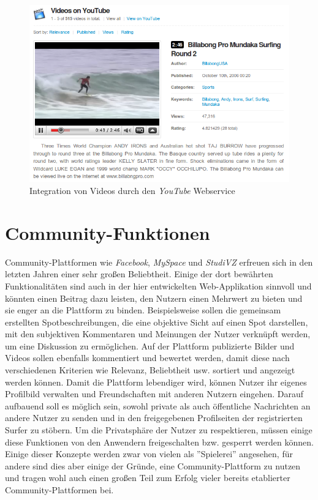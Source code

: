 \begin{figure}[h]
 \includegraphics[width=\textwidth]{bilder/youtube}
 \caption{Integration von Videos durch den \textit{YouTube}
      Webservice}
 \label{youtube}
\end{figure}

\section{Community-Funktionen}
Community-Plattformen wie \textit{Facebook}, \textit{MySpace} und
\textit{StudiVZ} erfreuen sich in den letzten Jahren einer sehr großen
Beliebtheit. Einige der dort bewährten Funktionalitäten sind auch in
der hier entwickelten Web-Applikation sinnvoll und könnten einen
Beitrag dazu leisten, den Nutzern einen Mehrwert zu bieten und sie
enger an die Plattform zu binden. Beispielsweise sollen die gemeinsam
erstellten Spotbeschreibungen, die eine objektive Sicht auf einen Spot
darstellen, mit den subjektiven Kommentaren und Meinungen der Nutzer
verknüpft werden, um eine Diskussion zu ermöglichen. Auf der Plattform
publizierte Bilder und Videos sollen ebenfalls kommentiert und
bewertet werden, damit diese nach verschiedenen Kriterien wie
Relevanz, Beliebtheit usw. sortiert und angezeigt werden können. Damit
die Plattform lebendiger wird, können Nutzer ihr eigenes Profilbild
verwalten und Freundschaften mit anderen Nutzern eingehen. Darauf
aufbauend soll es möglich sein, sowohl private als auch öffentliche
Nachrichten an andere Nutzer zu senden und in den freigegebenen
Profilseiten der registrierten Surfer zu stöbern. Um die Privatsphäre
der Nutzer zu respektieren, müssen einige diese Funktionen von den
Anwendern freigeschalten bzw. gesperrt werden können. Einige dieser
Konzepte werden zwar von vielen als ''Spielerei'' angesehen, für
andere sind dies aber einige der Gründe, eine Community-Plattform zu
nutzen und tragen wohl auch einen großen Teil zum Erfolg vieler
bereits etablierter Community-Plattformen bei.

